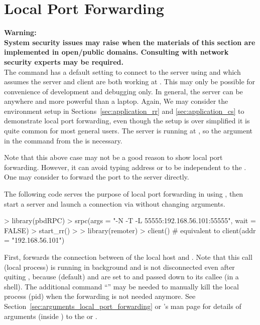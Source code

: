 \section[Local Port Forwarding]{Local Port Forwarding}
\label{sec:local_port_forwarding}

{\color{red} \bf Warning:\\
System security issues may raise when the materials of this section are
implemented in open/public domains. Consulting with network security experts
may be required.
}
\\

The  command  has a default setting
to connect to the  server using  and
 which assumes the  server and client are
both working at .
This may only be possible for convenience of development and debugging only.
In general, the server can be anywhere and more powerful than a laptop.
Again, We may consider the environment setup in
Sections~\ref{sec:application_rr} and \ref{sec:application_cs} to
demonstrate local port forwarding, even though the setup is over simplified
it is quite common for most general users.
The server is running at , so the argument
 in the 
command  from the 
is necessary.

Note that this above case may not be a good reason to show local port
forwarding.
However, it can avoid typing address or to be independent to the .
One may consider to forward the  port  to the
server directly.

The following code serves the purpose of local port forwarding in
 using , then start a  server and
launch a connection via  without changing arguments.
\begin{Code}[title=Forward \code{localhost:55555} to \code{192.168.56.101:55555}]
> library(pbdRPC)
> srpc(args = "-N -T -L 55555:192.168.56.101:55555", wait = FALSE)
> start_rr()
>
> library(remoter)
> client()    # equivalent to client(addr = "192.168.56.101")
\end{Code}

First, 
forwards the connection between  of the local host and
.
Note that this call (local process) is running in background and is
not disconnected even after quiting ,
because  (default) and {\color{red} }
are set to  and passed down to its callee (in a shell).
{\color{red}
The additional command ``'' may be needed to manually
kill the local process (pid) when the forwarding is not needed anymore.
}
See Section~\ref{sec:arguments_local_port_forwarding} or
's man page for details of arguments 
(inside ) to the  or .

